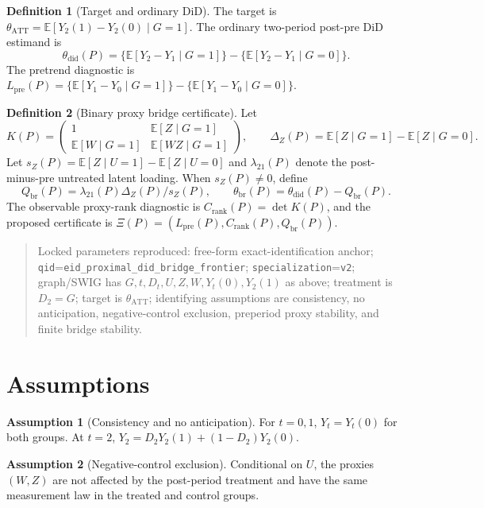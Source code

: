 \documentclass[11pt]{article}
\newcommand{\E}{\mathbb{E}}
\theoremstyle{definition}
\newtheorem{definition}{Definition}
\newtheorem{assumption}{Assumption}
\theoremstyle{plain}
\theoremstyle{remark}
\begin{document}
\begin{definition}[Target and ordinary DiD]
The target is $\theta_{\mathrm{ATT}}=\E[Y_2(1)-Y_2(0)\mid G=1]$. The ordinary
two-period post-pre DiD estimand is
\[
\theta_{\mathrm{did}}(P)=\{\E[Y_2-Y_1\mid G=1]\}-\{\E[Y_2-Y_1\mid G=0]\}.
\]
The pretrend diagnostic is
$L_{\mathrm{pre}}(P)=\{\E[Y_1-Y_0\mid G=1]\}-\{\E[Y_1-Y_0\mid G=0]\}$.
\end{definition}

\begin{definition}[Binary proxy bridge certificate]
Let
\[
K(P)=
\begin{pmatrix}
1 & \E[Z\mid G=1]\\
\E[W\mid G=1] & \E[WZ\mid G=1]
\end{pmatrix},
\qquad
\Delta_Z(P)=\E[Z\mid G=1]-\E[Z\mid G=0].
\]
Let $s_Z(P)=\E[Z\mid U=1]-\E[Z\mid U=0]$ and
$\lambda_{21}(P)$ denote the post-minus-pre untreated latent loading. When
$s_Z(P)\ne0$, define
\[
Q_{\mathrm{br}}(P)=\lambda_{21}(P)\Delta_Z(P)/s_Z(P),\qquad
\theta_{\mathrm{br}}(P)=\theta_{\mathrm{did}}(P)-Q_{\mathrm{br}}(P).
\]
The observable proxy-rank diagnostic is
$C_{\mathrm{rank}}(P)=\det K(P)$, and the proposed certificate is
$\Xi(P)=(L_{\mathrm{pre}}(P),C_{\mathrm{rank}}(P),Q_{\mathrm{br}}(P))$.
\end{definition}

\begin{quote}\small
Locked parameters reproduced: free-form exact-identification anchor;
\texttt{qid}=\texttt{eid\_proximal\_did\_bridge\_frontier};
\texttt{specialization}=\texttt{v2}; graph/SWIG has
$G,t,D_t,U,Z,W,Y_t(0),Y_2(1)$ as above; treatment is $D_2=G$; target is
$\theta_{\mathrm{ATT}}$; identifying assumptions are consistency, no
anticipation, negative-control exclusion, preperiod proxy stability, and
finite bridge stability.
\end{quote}

\section{Assumptions}
\begin{assumption}[Consistency and no anticipation]\label{ass:consistency}
For $t=0,1$, $Y_t=Y_t(0)$ for both groups. At $t=2$,
$Y_2=D_2Y_2(1)+(1-D_2)Y_2(0)$.
\end{assumption}

\begin{assumption}[Negative-control exclusion]\label{ass:nc-exclusion}
Conditional on $U$, the proxies $(W,Z)$ are not affected by the post-period
treatment and have the same measurement law in the treated and control groups.
\end{assumption}
\end{document}
